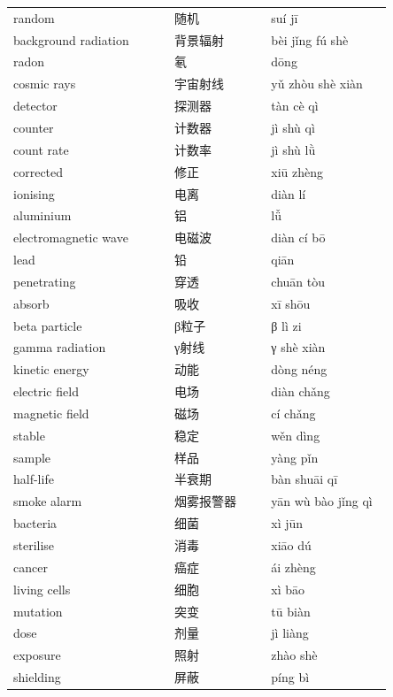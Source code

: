 \documentclass[11pt]{article}
\begin{document}
\begin{longtable}{@{}p{0.40\linewidth}p{0.24\linewidth}p{0.30\linewidth}@{}}
random & 随机 & suí jī \\
background radiation & 背景辐射 & bèi jǐng fú shè \\
radon & 氡 & dōng \\
cosmic rays & 宇宙射线 & yǔ zhòu shè xiàn \\
detector & 探测器 & tàn cè qì \\
counter & 计数器 & jì shù qì \\
count rate & 计数率 & jì shù lǜ \\
corrected & 修正 & xiū zhèng \\
ionising & 电离 & diàn lí \\
aluminium & 铝 & lǚ \\
electromagnetic wave & 电磁波 & diàn cí bō \\
lead & 铅 & qiān \\
penetrating & 穿透 & chuān tòu \\
absorb & 吸收 & xī shōu \\
beta particle & β粒子 & β lì zi \\
gamma radiation & γ射线 & γ shè xiàn \\
kinetic energy & 动能 & dòng néng \\
electric field & 电场 & diàn chǎng \\
magnetic field & 磁场 & cí chǎng \\
stable & 稳定 & wěn dìng \\
sample & 样品 & yàng pǐn \\
half-life & 半衰期 & bàn shuāi qī \\
smoke alarm & 烟雾报警器 & yān wù bào jǐng qì \\
bacteria & 细菌 & xì jūn \\
sterilise & 消毒 & xiāo dú \\
cancer & 癌症 & ái zhèng \\
living cells & 细胞 & xì bāo \\
mutation & 突变 & tū biàn \\
dose & 剂量 & jì liàng \\
exposure & 照射 & zhào shè \\
shielding & 屏蔽 & píng bì \\
\end{longtable}
\end{document}
